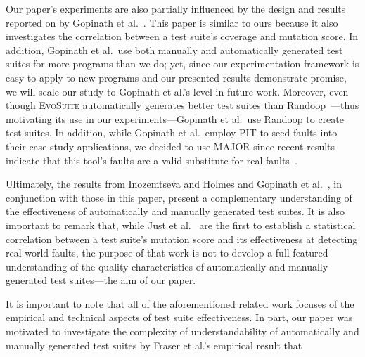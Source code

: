 Our paper's experiments are also partially influenced by the design and results reported on by Gopinath et
al.~\cite{gopinath2014}.  This paper is similar to ours because it also investigates the correlation between a test
suite's coverage and mutation score.  In addition, Gopinath et al.\ use both manually and automatically generated test
suites for more programs than we do; yet, since our experimentation framework is easy to apply to new programs and our
presented results demonstrate promise, we will scale our study to Gopinath et al.'s level in future work. Moreover, even
though \textsc{EvoSuite} automatically generates better test suites than Randoop~\cite{fraser2013a}---thus motivating its use in
our experiments---Gopinath et al.\ use Randoop to create test suites.  In addition, while Gopinath et al.\ employ PIT to
seed faults into their case study applications, we decided to use MAJOR since recent results indicate that this tool's
faults are a valid substitute for real faults~\cite{just2014}. 

Ultimately, the results from Inozemtseva and Holmes \cite{inozemtseva2014} and Gopinath et al.~\cite{gopinath2014}, in
conjunction with those in this paper, present a complementary understanding of the effectiveness of automatically and
manually generated test suites. It is also important to remark that, while Just et al.~\cite{just2014} are the first to
establish a statistical correlation between a test suite's mutation score and its effectiveness at detecting real-world
faults, the purpose of that work is not to develop a full-featured understanding of the quality characteristics of
automatically and manually generated test suites---the aim of our paper.


It is important to note that all of the aforementioned related work focuses of the empirical and technical aspects of
test suite effectiveness.  In part, our paper was motivated to investigate the complexity of understandability of automatically
and manually generated test suites by Fraser et al.'s empirical result that 


